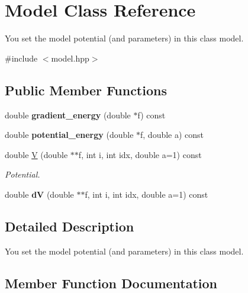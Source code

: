 \hypertarget{class_model}{}\section{Model Class Reference}
\label{class_model}


You set the model potential (and parameters) in this class model.  




{\ttfamily \#include $<$model.\+hpp$>$}

\subsection*{Public Member Functions}
\begin{DoxyCompactItemize}
\item 
\mbox{\label{class_model_ab00000d80ed947859bc69f05322d8038}} 
double {\bfseries gradient\+\_\+energy} (double $\ast$f) const
\item 
\mbox{\label{class_model_ad84316146a32691f3c66f774eedcc139}} 
double {\bfseries potential\+\_\+energy} (double $\ast$f, double a) const
\item 
double \mbox{\hyperlink{class_model_a9b339be9bef53eb7fd511a25a4c07608}{V}} (double $\ast$$\ast$f, int i, int idx, double a=1) const
\begin{DoxyCompactList}\small\item\em Potential. \end{DoxyCompactList}\item 
\mbox{\label{class_model_a3124dc0624f866668626ccb0c3fa0b1f}} 
double {\bfseries dV} (double $\ast$$\ast$f, int i, int idx, double a=1) const
\end{DoxyCompactItemize}


\subsection{Detailed Description}
You set the model potential (and parameters) in this class model. 

\subsection{Member Function Documentation}
\mbox{\label{class_model_a9b339be9bef53eb7fd511a25a4c07608}} 
